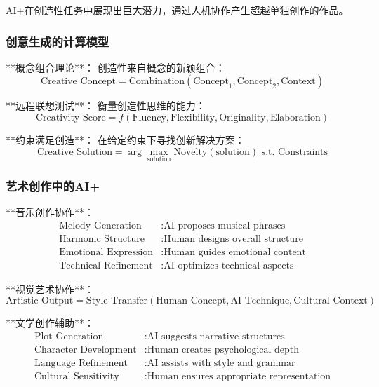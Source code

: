 AI+在创造性任务中展现出巨大潜力，通过人机协作产生超越单独创作的作品。

\subsubsection{创意生成的计算模型} %

**概念组合理论**：
创造性来自概念的新颖组合：
\begin{equation}
\text{Creative Concept} = \text{Combination}(\text{Concept}_1, \text{Concept}_2, \text{Context})
\end{equation}

**远程联想测试**：
衡量创造性思维的能力：
\begin{equation}
\text{Creativity Score} = f(\text{Fluency}, \text{Flexibility}, \text{Originality}, \text{Elaboration})
\end{equation}

**约束满足创造**：
在给定约束下寻找创新解决方案：
\begin{equation}
\text{Creative Solution} = \arg\max_{\text{solution}} \text{Novelty}(\text{solution}) \text{ s.t. } \text{Constraints}
\end{equation}

\subsubsection{艺术创作中的AI+} %

**音乐创作协作**：
\begin{align}
\text{Melody Generation} &: \text{AI proposes musical phrases} \\
\text{Harmonic Structure} &: \text{Human designs overall structure} \\
\text{Emotional Expression} &: \text{Human guides emotional content} \\
\text{Technical Refinement} &: \text{AI optimizes technical aspects}
\end{align}

**视觉艺术协作**：
\begin{equation}
\text{Artistic Output} = \text{Style Transfer}(\text{Human Concept}, \text{AI Technique}, \text{Cultural Context})
\end{equation}

**文学创作辅助**：
\begin{align}
\text{Plot Generation} &: \text{AI suggests narrative structures} \\
\text{Character Development} &: \text{Human creates psychological depth} \\
\text{Language Refinement} &: \text{AI assists with style and grammar} \\
\text{Cultural Sensitivity} &: \text{Human ensures appropriate representation}
\end{align}

